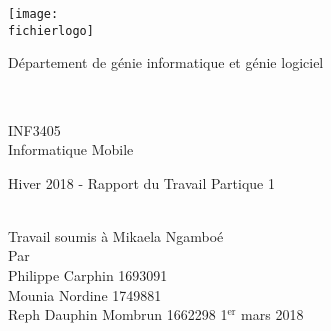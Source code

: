 \documentclass[12pt,titlepage]{article}
\newcommand{\dateremise}{1$^{\mathrm{er}}$ mars 2018}
\newcommand{\letitre}{Hiver 2018 - Rapport du Travail Partique 1\\}
\newcommand{\presentea}{Mikaela Ngamboé\\}
\newcommand{\fichierlogo}{logo_poly.pdf}
\newcommand{\organisation}{Département de génie informatique et génie logiciel \\ }
\newcommand{\lenumcours}{INF3405\\}
\newcommand{\letitrecours}{Informatique Mobile}
\newcommand{\lauteur}{Philippe Carphin 1693091\\Mounia Nordine 1749881\\Reph Dauphin Mombrun 1662298}
\begin{document}
\begin{titlepage}

\parbox[c]{1in}{\texttt{[image: \\fichierlogo]}}
\hfill \parbox[c]{3in}{\Large\raggedleft\organisation} \\
%
%
\begin{center}
\vfill
%
%
%
\large
\lenumcours
\letitrecours
%
%
\vfill
%
%
\parbox[b]{0.6\textwidth}{\center\letitre}\\
%
{\small Travail soumis à \presentea}
%
\vfill
Par\\
\lauteur
%
\vfill
\dateremise
%
\end{center}
\end{titlepage}
\end{document}
